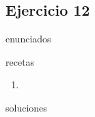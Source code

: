 \subsection{Ejercicio 12}
\def\parte{enunciados}
\ifx\capitulo\parte

\fi

\def\parte{recetas}
\ifx\capitulo\parte
\begin{enumerate}
\item
\end{enumerate}
\fi

\def\parte{soluciones}
\ifx\capitulo\parte
%
\fi
